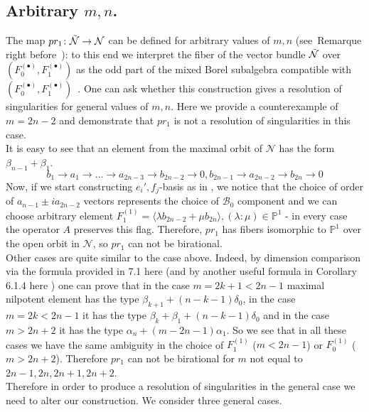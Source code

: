 \documentclass[12pt]{amsart}
\theoremstyle{definition}
\theoremstyle{remark}
\numberwithin{equation}{subsection}
\begin{document}
    \subsection{Arbitrary $m,n$.}
The map $pr_1\colon  \Tilde{\mathcal{N}} \rightarrow \mathcal{N}$ can be defined for arbitrary
values of $m,n$ (see~Remarque right before~\cite[Th\'eor\`eme 1]{GS}): to this end we interpret
the fiber of the vector bundle $\Tilde{\mathcal{N}}$ over $(F_0^{(\bullet)},F_1^{(\bullet)})$ as
the odd part of the mixed Borel subalgebra compatible with
$(F_0^{(\bullet)},F_1^{(\bullet)})$~\cite[D\'efinition 5]{GS}.
One can ask whether this construction gives a resolution of singularities for general
values of $m,n$. Here we provide a counterexample of $m=2n-2$ and demonstrate that $pr_1$ is not a resolution of singularities in this case.\\
    It is easy to see that an element from the maximal orbit of $\mathcal{N}$ has the form $\beta_{n-1}+\beta_{1}$. 
    \begin{equation}
        b_1\rightarrow a_1 \rightarrow \dots \rightarrow a_{2n-3} \rightarrow b_{2n-2} \rightarrow 0, b_{2n-1}\rightarrow a_{2n-2} \rightarrow b_{2n}\rightarrow 0
    \end{equation}
    Now, if we start constructing $e_i',f_j$-basis as in \cite{GL}, we notice that the choice of order of $a_{n-1}\pm ia_{2n-2}$ vectors represents the choice of $\mathcal{B}_0$ component and we can choose arbitrary element $F_{1}^{(1)}=\langle \lambda b_{2n-2}+\mu b_{2n} \rangle, (\lambda:\mu)\in \mathbb{P}^1$ - in every case the operator $A$ preserves this flag. Therefore, $pr_1$ has fibers isomorphic to $\mathbb{P}^1$ over the open orbit in $\mathcal{N}$, so $pr_1$ can not be birational.\\
    Other cases are quite similar to the case above. Indeed, by dimension comparison via the formula provided in 7.1 here \cite{KP} (and by another useful formula in Corollary 6.1.4 here \cite{DC}) one can prove that in the case $m=2k+1<2n-1$ maximal nilpotent element has the type $\beta_{k+1}+(n-k-1)\delta_0$, in the case $m=2k<2n-1$ it has the type $\beta_k+ \beta_1+ (n-k-1)\delta_0$ and in the case $m>2n+2$ it has the type $\alpha_n+(m-2n-1)\alpha_1$. So we see that in all these cases we have the same ambiguity in the choice of $F_{1}^{(1)}$ ($m<2n-1$) or $F_{0}^{(1)}$ ($m>2n+2$). Therefore $pr_1$ can not be birational for $m$ not equal to $2n-1,2n,2n+1,2n+2$.\\
    Therefore in order to produce a resolution of singularities in the general case we need to alter our construction. We consider three general cases.\\
    
\end{document}
